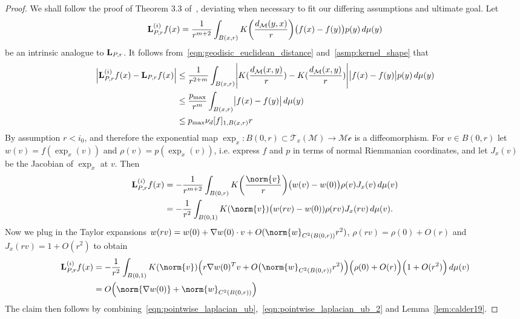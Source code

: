 \documentclass{article}
\newcommand{\abs}[1]{\left \lvert #1 \right \rvert}
\newcommand{\1}{\mathbf{1}}
\newcommand{\Lap}{{\bf L}}
\newcommand{\mc}[1]{\mathcal{#1}}
\theoremstyle{alden}
\theoremstyle{aldenthm}
\theoremstyle{definition}
\theoremstyle{remark}
\begin{document}
\begin{proof}
	We shall follow the proof of Theorem 3.3 of~\citep{calder2019}, deviating when necessary to fit our differing assumptions and ultimate goal. Let
	\begin{equation*}
	\Lap_{P,r}^{(i)}f(x) = \frac{1}{r^{m + 2}} \int_{B(x,r)} K\biggl(\frac{d_{\mc{M}}(y,x)}{r}\biggr)\bigl(f(x) - f(y)\bigr) p(y) \,d\mu(y)
	\end{equation*} 
	be an intrinsic analogue to $\Lap_{P,r}$. It follows from~\eqref{eqn:geodisic_euclidean_distance} and~\ref{asmp:kernel_shape} that 
	\begin{align}
	\abs{\Lap_{P,r}^{(i)}f(x) - \Lap_{P,r}f(x)} & \leq \frac{1}{r^{2 + m}} \int_{B(x,r)} \Biggl|K(\frac{d_{\mc{M}}(x,y)}{r}) - K(\frac{d_{\mc{M}}(x,y)}{r})\Biggr| \bigl|f(x) - f(y)\bigr| p(y) \,d\mu(y) \nonumber \\ 
	& \leq \frac{p_{\max}}{r^{m}} \int_{B(x,r)} \bigl|f(x) - f(y)\bigr| \,d\mu(y)\\
	& \leq p_{\max} \nu_d[f]_{1,B(x,r)} r \label{eqn:pointwise_laplacian_ub}
	\end{align}
	By assumption $r < i_0$, and therefore the exponential map $\exp_x: B(0,r) \subset \mc{T}_{x}(\mc{M}) \to \mc{Mc}$ is a diffeomorphism. For $v \in B(0,r)$ let $w(v) = f(\exp_x(v))$ and $\rho(v) = p(\exp_x(v))$, i.e. express $f$ and $p$ in terms of normal Riemmanian coordinates,  and let $J_x(v)$ be the Jacobian of $\exp_x$ at $v$.  Then
	\begin{align*}
	\Lap_{P,r}^{(i)}f(x) & = -\frac{1}{r^{m + 2}} \int_{B(0,r)} K\biggl(\frac{\norm{v}}{r}\biggr)\bigl(w(v) - w(0)\bigr) \rho(v) J_x(v) \,d\mu(v) \\
	& = -\frac{1}{r^2} \int_{B(0,1)} K(\norm{v})  \bigl(w(rv) - w(0)) \rho(rv) J_x(rv) \,d\mu(v).
	\end{align*}
	Now we plug in the Taylor expansions $w(rv) = w(0) + \nabla w(0) \cdot v + O(\norm{w}_{C^2(B(0,r))}r^2)$, $\rho(rv) = \rho(0) + O(r)$ and $J_x(rv) = 1 + O(r^2)$ to obtain
	\begin{align}
	\Lap_{P,r}^{(i)}f(x) & = -\frac{1}{r^2} \int_{B(0,1)} K(\norm{v})  \Bigl(r \nabla w(0)^T v + O\bigl(\norm{w}_{C^2(B(0,r))}r^2\bigr)\Bigr) \Bigl(\rho(0) + O(r)\Bigr) \Bigl(1 + O(r^2)\Bigr) \,d\mu(v) \nonumber \\
	& = O\Bigl(\norm{\nabla w(0)} +  \norm{w}_{C^2(B(0,r))} \Bigr) \label{eqn:pointwise_laplacian_ub_2}
	\end{align}
	The claim then follows by combining~\eqref{eqn:pointwise_laplacian_ub},~\eqref{eqn:pointwise_laplacian_ub_2} and Lemma~\ref{lem:calder19}.
\end{proof}
\end{document}
